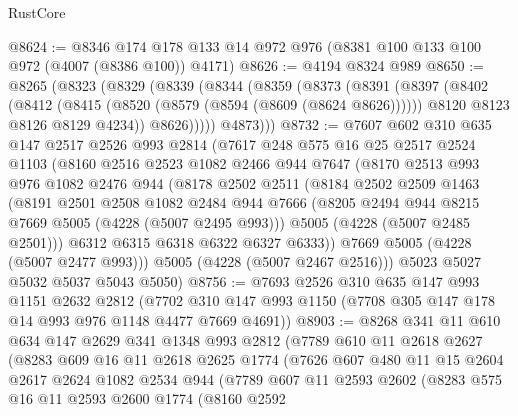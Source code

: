 \begin{lexlean}{RustCore}
\begin{coremodule}
@8624 := @8346 @174 @178 @133 @14 @972 @976 (@8381 @100 @133 @100 @972 (@4007 (@8386 @100)) @4171)
@8626 := @4194 @8324 @989
@8650 := @8265
    (@8323
      (@8329
        (@8339
          (@8344
            (@8359
              (@8373
                (@8391
                  (@8397
                    (@8402
                      (@8412
                        (@8415 (@8520 (@8579 (@8594 (@8609 (@8624 @8626))))))
                        @8120
                        @8123
                        @8126
                        @8129
                        @4234))
                    @8626)))))
          @4873)))
@8732 := @7607
    @602
    @310
    @635
    @147
    @2517
    @2526
    @993
    @2814
    (@7617
      @248
      @575
      @16
      @25
      @2517
      @2524
      @1103
      (@8160
        @2516
        @2523
        @1082
        @2466
        @944
        @7647
        (@8170
          @2513
          @993
          @976
          @1082
          @2476
          @944
          (@8178
            @2502
            @2511
            (@8184
              @2502
              @2509
              @1463
              (@8191
                @2501
                @2508
                @1082
                @2484
                @944
                @7666
                (@8205 @2494 @944 @8215 @7669 @5005 (@4228 (@5007 @2495 @993)))
                @5005
                (@4228 (@5007 @2485 @2501)))
              @6312
              @6315
              @6318
              @6322
              @6327
              @6333))
          @7669
          @5005
          (@4228 (@5007 @2477 @993)))
        @5005
        (@4228 (@5007 @2467 @2516)))
      @5023
      @5027
      @5032
      @5037
      @5043
      @5050)
@8756 := @7693
    @2526
    @310
    @635
    @147
    @993
    @1151
    @2632
    @2812
    (@7702 @310 @147 @993 @1150 (@7708 @305 @147 @178 @14 @993 @976 @1148 @4477 @7669 @4691))
@8903 := @8268
    @341
    @11
    @610
    @634
    @147
    @2629
    @341
    @1348
    @993
    @2812
    (@7789
      @610
      @11
      @2618
      @2627
      (@8283
        @609
        @16
        @11
        @2618
        @2625
        @1774
        (@7626
          @607
          @480
          @11
          @15
          @2604
          @2617
          @2624
          @1082
          @2534
          @944
          (@7789
            @607
            @11
            @2593
            @2602
            (@8283
              @575
              @16
              @11
              @2593
              @2600
              @1774
              (@8160
                @2592

\end{coremodule}
\end{lexlean}
